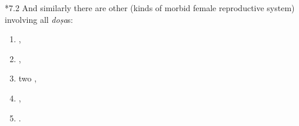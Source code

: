 \begin{translation}
\item [*7.2] And similarly there are other (kinds of morbid female reproductive 
system) involving all \emph{doṣa}s:
\begin{enumerate}
    \item {},
    \item {},
    \item two ,
    \item {},
    \item {}.
\end{enumerate}
\end{translation}


